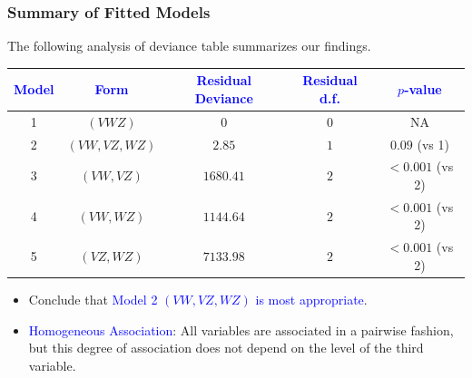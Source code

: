 \documentclass[oneside]{book}\usepackage[]{graphicx}\usepackage[svgnames]{xcolor}
\begin{document}
\subsubsection*{Summary of Fitted Models}
The following analysis of deviance table summarizes our findings.
\begin{table}[H]
    \centering
    \begin{tabular}{ccccc}
        \toprule
        \textcolor{Blue}{Model} & \textcolor{Blue}{Form} & \textcolor{Blue}{Residual Deviance} & \textcolor{Blue}{Residual d.f.} & \textcolor{Blue}{$ p $-value} \\
        \midrule
        1                       & $ (VWZ) $              & 0                                   & 0                               & NA                            \\
        \midrule
        2                       & $(VW, VZ, WZ)$         & $2.85$                              & $1$                             & $0.09$ (vs 1)                 \\
        \midrule
        3                       & $(VW, VZ)$             & $1680.41$                           & $2$                             & $<0.001$ (vs 2)               \\
        4                       & $(VW, WZ)$             & $1144.64$                           & $2$                             & $<0.001$  (vs 2)              \\
        5                       & $(VZ, WZ)$             & $7133.98$                           & $2$                             & $<0.001$  (vs 2)              \\
        \bottomrule
    \end{tabular}
\end{table}
\begin{itemize}
    \item Conclude that \textcolor{Blue}{Model 2 $ (VW,VZ,WZ) $ is most appropriate}.
    \item \textcolor{Blue}{Homogeneous Association}: All variables are associated in a pairwise fashion, but
          this degree of association does not depend on the level of the third variable.
\end{itemize}
\end{document}
